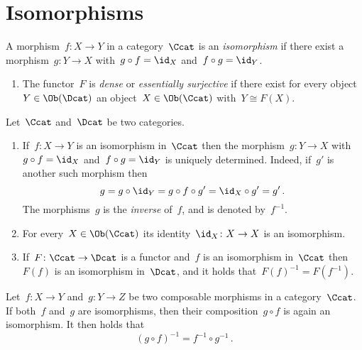 \section{Isomorphisms}


\begin{definition}
  A morphism~$f \colon X \to Y$ in a category~$\Ccat$ is an \emph{isomorphism} if there exist a morphism~$g \colon Y \to X$ with~$g \circ f = \id_X$ and~$f \circ g = \id_Y$.
\end{definition}


\begin{definition}[continues=properties of functors]
  \leavevmode
  \begin{enumerate}[start=4]
    \item
      The functor~$F$ is \emph{dense} or \emph{essentially surjective} if there exist for every object~$Y \in \Ob(\Dcat)$ an object~$X \in \Ob(\Ccat)$ with~$Y \cong F(X)$.
  \end{enumerate}
\end{definition}


\begin{remark}
  Let~$\Ccat$ and~$\Dcat$ be two categories.
  \begin{enumerate}
    \item
      If~$f \colon X \to Y$ is an isomorphism in~$\Ccat$ then the morphism~$g \colon Y \to X$ with~$g \circ f = \id_X$ and~$f \circ g = \id_Y$ is uniquely determined.
      Indeed, if~$g'$ is another such morphism then
      \[
        g
        =
        g \circ {\id_Y}
        =
        g \circ f \circ g'
        =
        {\id_X} \circ g'
        =
        g'  \,.
      \]
      The morphisms~$g$ is the \emph{inverse} of~$f$, and is denoted by~$f^{-1}$.
    \item
      For every~$X \in \Ob(\Ccat)$ its identity~$\id_X \colon X \to X$ is an isomorphism.
    \item
      If~$F \colon \Ccat \to \Dcat$ is a functor and~$f$ is an isomorphism in~$\Ccat$ then~$F(f)$ is an isomorphism in~$\Dcat$, and it holds that~$F(f)^{-1} = F(f^{-1})$.
  \end{enumerate}
\end{remark}


\begin{remark*}
  Let~$f \colon X \to Y$ and~$g \colon Y \to Z$ be two composable morphisms in a category~$\Ccat$.
  If both~$f$ and~$g$ are isomorphisms, then their composition~$g \circ f$ is again an isomorphism.
  It then holds that
  \[
    (g \circ f)^{-1}
    =
    f^{-1} \circ g^{-1} \,.
  \]
\end{remark*}


